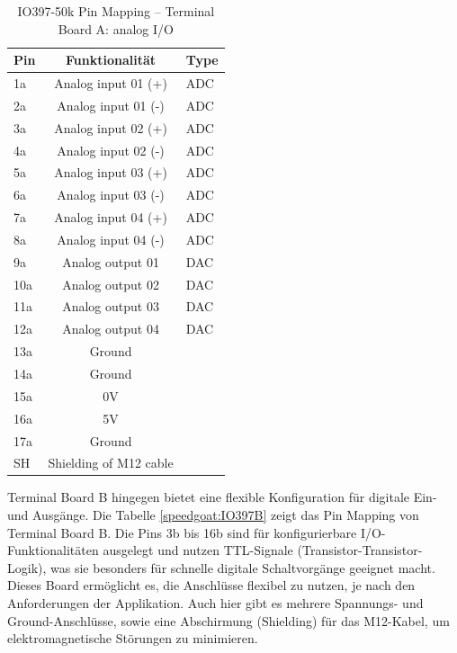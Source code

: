 \begin{table}[ht]
	\centering
	\caption{IO397-50k Pin Mapping – Terminal Board A: analog I/O \cite{speedgoat:IO397}}
	\label{speedgoat:IO397A}
	\begin{tabular}{lcl}
		\hline
		\textbf{Pin}             & \textbf{Funktionalität} & \textbf{Type} \\ \hline
		\multicolumn{1}{l|}{1a}  & Analog input 01 (+)     & ADC           \\
		\multicolumn{1}{l|}{2a}  & Analog input 01 (-)     & ADC           \\
		\multicolumn{1}{l|}{3a}  & Analog input 02 (+)     & ADC           \\
		\multicolumn{1}{l|}{4a}  & Analog input 02 (-)     & ADC           \\
		\multicolumn{1}{l|}{5a}  & Analog input 03 (+)     & ADC           \\
		\multicolumn{1}{l|}{6a}  & Analog input 03 (-)     & ADC           \\
		\multicolumn{1}{l|}{7a}  & Analog input 04 (+)     & ADC           \\
		\multicolumn{1}{l|}{8a}  & Analog input 04 (-)     & ADC           \\ \hline
		\multicolumn{1}{l|}{9a}  & Analog output 01        & DAC           \\
		\multicolumn{1}{l|}{10a} & Analog output 02        & DAC           \\
		\multicolumn{1}{l|}{11a} & Analog output 03        & DAC           \\
		\multicolumn{1}{l|}{12a} & Analog output 04        & DAC           \\ \hline
		\multicolumn{1}{l|}{13a} & Ground                  &               \\
		\multicolumn{1}{l|}{14a} & Ground                  &               \\
		\multicolumn{1}{l|}{15a} & 0V                      &               \\
		\multicolumn{1}{l|}{16a} & 5V                      &               \\
		\multicolumn{1}{l|}{17a} & Ground                  &               \\
		\multicolumn{1}{l|}{SH}  & Shielding of M12 cable  &               \\ \hline
	\end{tabular}
\end{table}

Terminal Board B hingegen bietet eine flexible Konfiguration für digitale Ein- und Ausgänge. Die Tabelle \ref{speedgoat:IO397B} zeigt das Pin Mapping von Terminal Board B. Die Pins 3b bis 16b sind für konfigurierbare I/O-Funktionalitäten ausgelegt und nutzen TTL-Signale (Transistor-Transistor-Logik), was sie besonders für schnelle digitale Schaltvorgänge geeignet macht. Dieses Board ermöglicht es, die Anschlüsse flexibel zu nutzen, je nach den Anforderungen der Applikation. Auch hier gibt es mehrere Spannungs- und Ground-Anschlüsse, sowie eine Abschirmung (Shielding) für das M12-Kabel, um elektromagnetische Störungen zu minimieren.


